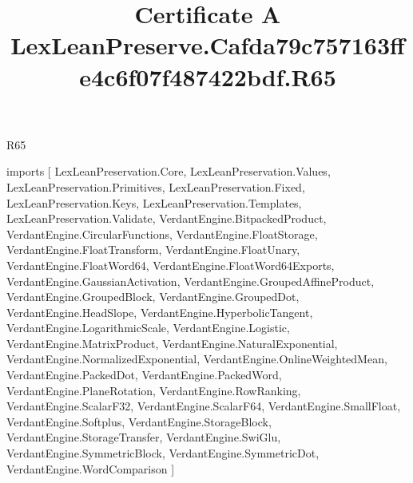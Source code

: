 \begin{lexlean}{R65}
\title{Certificate A LexLeanPreserve.Cafda79c757163ffe4c6f07f487422bdf.R65}
\begin{coremodule}
imports [
  LexLeanPreservation.Core,
  LexLeanPreservation.Values,
  LexLeanPreservation.Primitives,
  LexLeanPreservation.Fixed,
  LexLeanPreservation.Keys,
  LexLeanPreservation.Templates,
  LexLeanPreservation.Validate,
  VerdantEngine.BitpackedProduct,
  VerdantEngine.CircularFunctions,
  VerdantEngine.FloatStorage,
  VerdantEngine.FloatTransform,
  VerdantEngine.FloatUnary,
  VerdantEngine.FloatWord64,
  VerdantEngine.FloatWord64Exports,
  VerdantEngine.GaussianActivation,
  VerdantEngine.GroupedAffineProduct,
  VerdantEngine.GroupedBlock,
  VerdantEngine.GroupedDot,
  VerdantEngine.HeadSlope,
  VerdantEngine.HyperbolicTangent,
  VerdantEngine.LogarithmicScale,
  VerdantEngine.Logistic,
  VerdantEngine.MatrixProduct,
  VerdantEngine.NaturalExponential,
  VerdantEngine.NormalizedExponential,
  VerdantEngine.OnlineWeightedMean,
  VerdantEngine.PackedDot,
  VerdantEngine.PackedWord,
  VerdantEngine.PlaneRotation,
  VerdantEngine.RowRanking,
  VerdantEngine.ScalarF32,
  VerdantEngine.ScalarF64,
  VerdantEngine.SmallFloat,
  VerdantEngine.Softplus,
  VerdantEngine.StorageBlock,
  VerdantEngine.StorageTransfer,
  VerdantEngine.SwiGlu,
  VerdantEngine.SymmetricBlock,
  VerdantEngine.SymmetricDot,
  VerdantEngine.WordComparison
]


\end{coremodule}
\end{lexlean}
